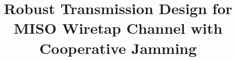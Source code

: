 \documentclass[journal]{IEEEtran}
\begin{document}
%
\title{Robust Transmission Design for MISO Wiretap Channel with Cooperative Jamming}



\author{
}


% 
\end{document}
